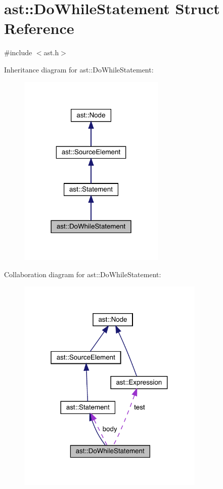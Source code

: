 \hypertarget{structast_1_1_do_while_statement}{}\section{ast\+:\+:Do\+While\+Statement Struct Reference}
\label{structast_1_1_do_while_statement}


{\ttfamily \#include $<$ast.\+h$>$}



Inheritance diagram for ast\+:\+:Do\+While\+Statement\+:
\nopagebreak
\begin{figure}[H]
\begin{center}
\leavevmode
\includegraphics[width=198pt]{structast_1_1_do_while_statement__inherit__graph}
\end{center}
\end{figure}


Collaboration diagram for ast\+:\+:Do\+While\+Statement\+:
\nopagebreak
\begin{figure}[H]
\begin{center}
\leavevmode
\includegraphics[width=253pt]{structast_1_1_do_while_statement__coll__graph}
\end{center}
\end{figure}
